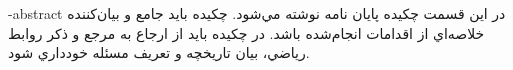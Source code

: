 \fa-abstract{
در اين قسمت چكيده پایان نامه نوشته مي‌شو‌د‌.‌ چكيده بايد جامع و بيان‌كننده‌ خلاصه‌اي از 
اقدامات انجام‌شده باشد. در چكيده باید از ارجاع به مرجع و ذكر روابط رياضي، بيان 
تاريخچه و تعريف مسئله خودداري ‌شود. 
}


